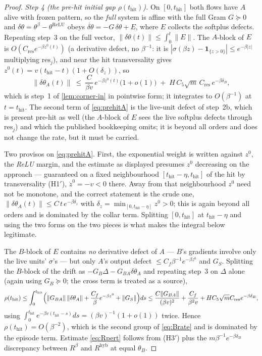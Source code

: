 \documentclass[11pt]{article}
\theoremstyle{definition}
\theoremstyle{remark}
\newcommand{\hyb}{\mathrm{hyb}}
\newcommand{\thit}{t_{\mathrm{hit}}}
\newcommand{\res}{\mathrm{res}}
\begin{document}
\begin{proof}
\emph{Step 4 (the pre-hit initial gap $\rho(\thit)$).} On $[0,\thit]$ both flows
have $A$ alive with frozen pattern, so the \emph{full} system is affine with the
full Gram $G\succeq0$ and $\delta\theta=\theta^\beta-\theta^{\mathrm{ReLU}}$
obeys $\dot{\delta\theta}=-G\,\delta\theta+E$, where $E$ collects the softplus
defects. Repeating step~3 on the full vector,
$\|\delta\theta(t)\|\le\int_0^t\|E\|$. The $A$-block of $E$ is
$O(C_{\mathrm{res}}e^{-\beta z^0(t)})$ (a derivative defect, no $\beta^{-1}$: it is
$|\sigma(\beta z)-\mathbf 1_{\{z>0\}}|\le e^{-\beta|z|}$ multiplying $\res_j$),
and near the hit transversality gives $z^0(t)=v(\thit-t)(1+O(\delta_z))$, so
\begin{equation}\label{eq:prehitA}
\|\delta\theta_A(t)\|\ \le\ \frac{C}{\beta v}\,e^{-\beta z^0(t)}\bigl(1+o(1)\bigr)
\;+\;H\,C_5\sqrt m\,C_{\mathrm{res}}\,e^{-\beta\delta_B},
\end{equation}
which is step~1 of \cref{lem:corner-in} in pointwise form; it integrates to
$O(\beta^{-1})$ at $t=\thit$. The second term of \eqref{eq:prehitA} is the
live-unit defect of step~2b, which is present pre-hit as well (the $A$-block of
$E$ sees the live softplus defects through $\res_j$) and which the published
bookkeeping omits; it is beyond all orders and does not change the rate, but it
must be carried.

Two provisos on \eqref{eq:prehitA}. First, the exponential weight is written
against $z^0$, the \emph{ReLU} margin, and the estimate as displayed presumes
$z^0$ decreasing on the approach --- guaranteed on a fixed neighbourhood
$[\thit-\eta,\thit]$ of the hit by transversality (H1$'$), $\dot z^0=-v<0$ there.
Away from that neighbourhood $z^0$ need not be monotone, and the correct
statement is the crude one, $\|\delta\theta_A(t)\|\le C\,t\,e^{-\beta\delta_z}$
with $\delta_z=\min_{[0,\thit-\eta]}z^0>0$; this is again beyond all orders and
is dominated by the collar term. Splitting $[0,\thit]$ at $\thit-\eta$ and using
the two forms on the two pieces is what makes the integral below legitimate.

The $B$-block of $E$ contains \emph{no} derivative
defect of $A$ --- $B$'s gradients involve only the live units' $\sigma$'s --- but
only $A$'s output defect $\le C_f\beta^{-1}e^{-\beta z^0}$ and $G_S$. Splitting
the $B$-block of the drift as $-G_B\Delta-G_{BA}\delta\theta_A$ and repeating
step~3 on $\Delta$ alone (again using $G_B\succeq0$; the cross term is treated as
a source),
\[
\rho(\thit)\le\int_0^{\thit}\Bigl(\|G_{BA}\|\,\|\delta\theta_A\|
+\frac{C_f}{\beta}e^{-\beta z^0}+\|G_S\|\Bigr)ds
\le\frac{C\|G_{BA}\|}{(\beta v)^2}+\frac{C_f}{\beta^2v}+HC_5\sqrt mC_{\mathrm{res}}e^{-\beta\delta_B},
\]
using $\int_0^{\thit}e^{-\beta v(\thit-s)}ds=(\beta v)^{-1}(1+o(1))$ twice. Hence
$\rho(\thit)=O(\beta^{-2})$, which is the second group of \eqref{eq:Brate} and is
dominated by the episode term. Estimate \eqref{eq:Rpert} follows from (H3$'$)
plus the $m\beta^{-1}e^{-\beta\delta_B}$ discrepancy between $R^\beta$ and
$R^{\hyb}$ at equal $\theta_B$.


\end{proof}
\end{document}
